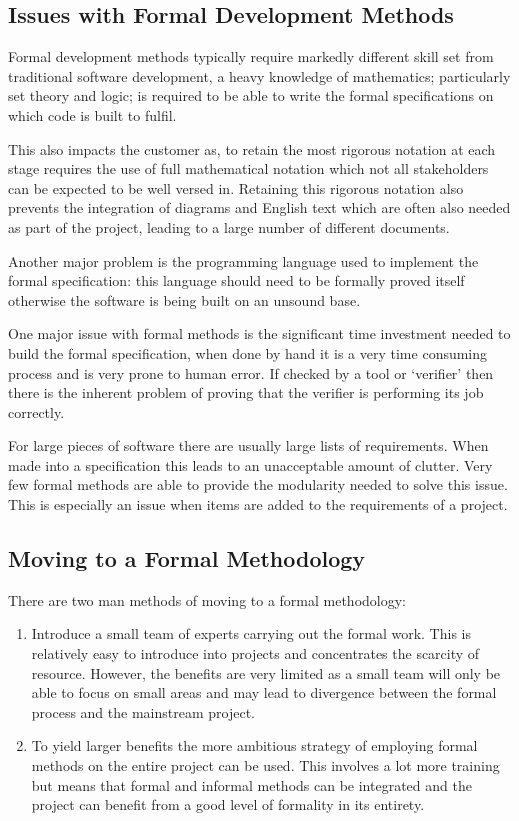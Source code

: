 \documentclass[a4paper, notitlepage, fleqn]{article}
\begin{document}
\subsection*{Issues with Formal Development Methods}
Formal development methods typically require markedly different skill set from traditional 
software development, a heavy knowledge of mathematics; particularly set theory and logic; is
required to be able to write the formal specifications on which code is built to fulfil. 

This also impacts the customer as, to retain the most rigorous notation at each stage requires the
use of full mathematical notation which not all stakeholders can be expected to be well versed in.
Retaining this rigorous notation also prevents the integration of diagrams and English text which 
are often also needed as part of the project, leading to a large number of different documents.

Another major problem is the programming language used to implement the formal specification:
this language should need to be formally proved itself otherwise the software is being built on an
unsound base.

One major issue with formal methods is the significant time investment needed to build the formal 
specification, when done by hand it is a very time consuming process and is very prone to human
error. If checked by a tool or `verifier' then there is the inherent problem of proving that the
verifier is performing its job correctly.

For large pieces of software there are usually large lists of requirements. When made into a 
specification this leads to an unacceptable amount of clutter. Very few formal methods are able
to provide the modularity needed to solve this issue. This is especially an issue when items are
added to the requirements of a project.

\subsection*{Moving to a Formal Methodology}
There are two man methods of moving to a formal methodology:

\begin{enumerate}
\item Introduce a small team of experts carrying out the formal work. This is relatively easy to 
introduce into projects and concentrates the scarcity of resource. However, the benefits are very
limited as a small team will only be able to focus on small areas and may lead to divergence 
between the formal process and the mainstream project.
\item To yield larger benefits the more ambitious strategy of employing formal methods on the 
entire project can be used. This involves a lot more training but means that formal and informal
methods can be integrated and the project can benefit from a good level of formality in its 
entirety.
\end{enumerate}
\end{document}
